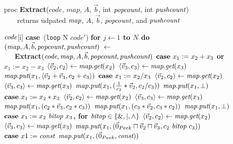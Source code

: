 \begin{algorithm}
proc {\bf Extract}($code$, $map$, $A$, $\vec b$, int $\mbox{\it popcount}$, int $\mbox{\it pushcount}$) \\
\verb+   + returns udpated $\mbox{\it map}$, $A$, ${\vec b}$, $\mbox{\it popcount}$, and $\mbox{\it pushcount}$ \\ \vspace{-12pt}
\begin{algorithmic}
 $\mbox{\it code}$[i]
\IND
\STATE \mbox{\bf case}~({\tt loop} N $code'$)
\IND
\STATE \bf{for} $j \leftarrow 1$ to $N$ {\bf do}
\IND
\STATE $(\mbox{\it map}, A, {\vec b}, \mbox{\it popcount}, \mbox{\it pushcount})~\leftarrow~$ \\
\verb+   +\bf{Extract}$(\mbox{\it code}, \mbox{\it map}, A, {\vec b}, \mbox{\it popcount}, \mbox{\it pushcount})$
\UND
\UND
\STATE \vspace{-6pt}
\STATE $\mbox{\bf case}~ x_1 := x_2 + x_3$ or $x_1 := x_2 - x_3$
\IND
\STATE $\langle{\vec v_2}, {c_2}\rangle \leftarrow \mbox{\it map}.\mbox{\it get}(x_2)$
\STATE $\langle{\vec v_3}, {c_3}\rangle \leftarrow \mbox{\it map}.\mbox{\it get}(x_3)$
\STATE $\mbox{\it map}.\mbox{\it put}(x_1, \langle{\vec v_2+\vec v_3}, {c_2+c_3}\rangle)$
\UND
\STATE \vspace{-6pt}
\STATE $\mbox{\bf case}~x_1 := x_2 / x_3$
\IND
\STATE $\langle{\vec v_2}, {c_2}\rangle \leftarrow \mbox{\it map}.\mbox{\it get}(x_2)$
\STATE $\langle{\vec v_3}, {c_3}\rangle \leftarrow \mbox{\it map}.\mbox{\it get}(x_3)$
\STATE $\mbox{\it map}.\mbox{\it put}(x_1, (\frac{1}{c_3}*\vec v_2, c_2/c_3))$
\ELSE
\STATE $\mbox{\it map}.\mbox{\it put}(x_1, \bot)$
\ENDIF
\UND
\STATE \vspace{-6pt}
\STATE $\mbox{\bf case}~x_1 := x_2 * x_3$
\IND
\STATE $\langle{\vec v_2}, {c_2}\rangle \leftarrow \mbox{\it map}.\mbox{\it get}(x_2)$
\STATE $\langle{\vec v_3}, {c_3}\rangle \leftarrow \mbox{\it map}.\mbox{\it get}(x_3)$
\STATE $\mbox{\it map}.\mbox{\it put}(x_1, (c_2*\vec v_3, c_2*c_3))$
\STATE $\mbox{\it map}.\mbox{\it put}(x_1, (c_3*\vec v_2, c_3*c_2))$
\ELSE
\STATE $\mbox{\it map}.\mbox{\it put}(x_1, \bot)$
\ENDIF
\UND
\STATE \vspace{-6pt}
\STATE $\mbox{\bf case}~x_1 := x_2 ~\mbox{\it bitop}~ x_3$, for $\mbox{\it bitop} \in \{\&, |, \wedge\}$
\IND
\STATE $\langle{\vec v_2}, {c_2}\rangle \leftarrow \mbox{\it map}.\mbox{\it get}(x_2)$
\STATE $\langle{\vec v_3}, {c_3}\rangle \leftarrow \mbox{\it map}.\mbox{\it get}(x_3)$
\STATE $\mbox{\it map}.\mbox{\it put}(x_1, (\vec 0_{Peek} \sqcap \vec v_2 \sqcap \vec v_3, c_2 ~\mbox{\it bitop}~ c_3))$
\UND
\STATE \vspace{-6pt}
\STATE $\mbox{\bf case}~x1 := \mbox{\it const}$
\IND
\STATE $\mbox{\it map}.\mbox{\it put}(x_1, (\vec 0_{Peek}, \mbox{\it const}))$

\end{algorithmic}
\end{algorithm}
